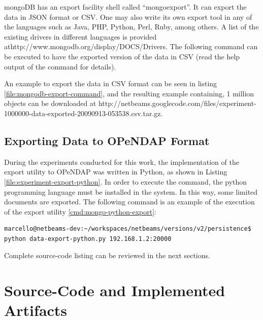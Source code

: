 mongoDB has an export facility shell called ``mongoexport''. It can export the
data in JSON format or CSV. One may also write its own export tool in any of the
languages such as Java, PHP, Python, Perl, Ruby, among others. A list of the
existing drivers in different languages is provided
athttp://www.mongodb.org/display/DOCS/Drivers. The following command can be
executed to have the exported version of the data in CSV (read the help output
of the command for details).

An example to export the data in CSV format can be seen in listing
\ref{file:mongodb-export-command}, and the resulting example containing, 1
million objects can be downloaded at
http://netbeams.googlecode.com/files/experiment-1000000-data-exported-20090913-053538.csv.tar.gz.

\subsection{Exporting Data to OPeNDAP Format}

During the experiments conducted for this work, the implementation of the
export utility to OPeNDAP was written in Python, as shown in Listing
\ref{file:experiment-export-python}. In order to execute the command, the
python programming language \cite{python} must be installed in the system. In
this way, some limited documents are exported. The following command is an
example of the execution of the export utility \ref{cmd:mongo-python-export}:

\lstset{label=cmd:mongo-python-export,caption=Query Element with specific
projection limiting the result set size}
\begin{lstlisting}
marcello@netbeams-dev:~/workspaces/netbeams/versions/v2/persistence$ python data-export-python.py 192.168.1.2:20000
\end{lstlisting}

Complete source-code listing can be reviewed in the next sections.

\section{Source-Code and Implemented Artifacts}





